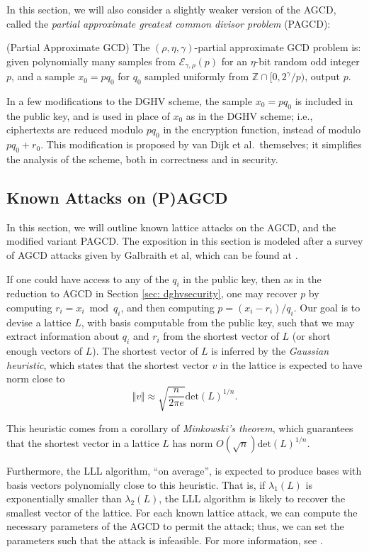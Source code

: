 In this section, we will also consider a slightly weaker version of the AGCD, called the \emph{partial approximate greatest common divisor problem} (PAGCD):
\begin{definition} (Partial Approximate GCD)
    The $(\rho, \eta, \gamma)$-partial approximate GCD problem is: given polynomially many samples from $\mathcal{E}_{\gamma, \rho}(p)$ for an $\eta$-bit random odd integer $p$, and a sample $x_0 = pq_0$ for $q_0$ sampled uniformly from $\mathbb{Z} \cap [0, 2^\gamma / p)$, output $p$.
\end{definition}

In a few modifications to the DGHV scheme, the sample $x_0 = pq_0$ is included in the public key, and is used in place of $x_0$ as in the DGHV scheme; i.e., ciphertexts are reduced modulo $pq_0$ in the encryption function, instead of modulo $pq_0 + r_0$. This modification is proposed by van Dijk et al.~themselves; it simplifies the analysis of the scheme, both in correctness and in security. \cite{dghv}

    \subsection{Known Attacks on (P)AGCD}
    In this section, we will outline known lattice attacks on the AGCD, and the modified variant PAGCD.
    The exposition in this section is modeled after a survey of AGCD attacks given by Galbraith et al, which can be found at \cite{galbraithalgorithms}.

    If one could have access to any of the $q_i$ in the public key, then as in the reduction to AGCD in Section \ref{sec: dghvsecurity}, one may recover $p$ by computing $r_i = x_i \bmod q_i$, and then computing $p = (x_i - r_i) / q_i$. Our goal is to devise a lattice $L$, with basis computable from the public key, such that we may extract information about $q_i$ and $r_i$ from the shortest vector of $L$ (or short enough vectors of $L$). The shortest vector of $L$ is inferred by the \emph{Gaussian heuristic}, which states that the shortest vector $v$ in the lattice is expected to have norm close to
    \[\Vert v \Vert \approx \sqrt{\frac{n}{2 \pi e}} \text{det}(L)^{1/n}.\]

    This heuristic comes from a corollary of \emph{Minkowski's theorem}, which guarantees that the shortest vector in a lattice $L$ has norm $O(\sqrt{n}) \text{det}(L)^{1/n}$.

    Furthermore, the LLL algorithm, ``on average'', is expected to produce bases with basis vectors polynomially close to this heuristic. That is, if $\lambda_1(L)$ is exponentially smaller than $\lambda_2(L)$, the LLL algorithm is likely to recover the smallest vector of the lattice. For each known lattice attack, we can compute the necessary parameters of the AGCD to permit the attack; thus, we can set the parameters such that the attack is infeasible. For more information, see \cite{galbraithalgorithms}.




